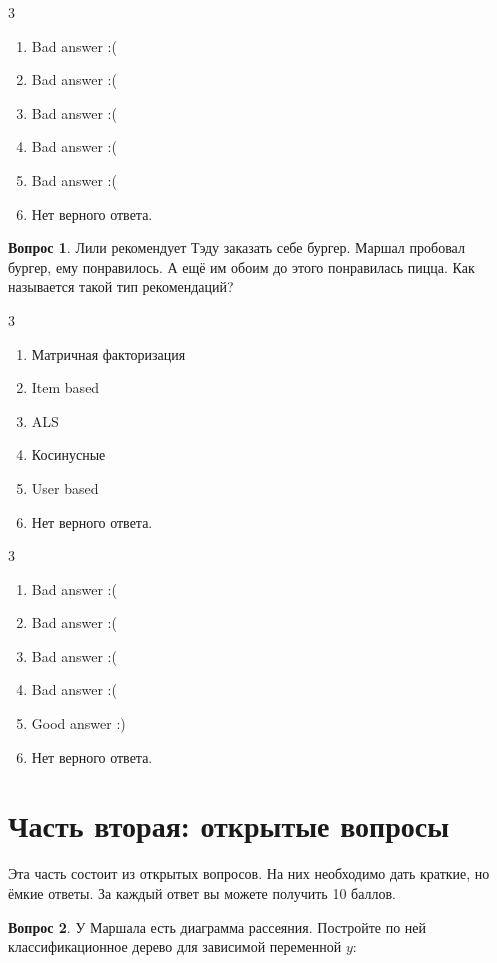 \documentclass[12pt]{article}
\newenvironment{answerlist}[1][3]{
\begin{multicols}{#1}

\begin{enumerate}[label=\fbox{\emph{\Alph*}},ref=\emph{\alph*}]
}
{
\item Нет верного ответа.
\end{enumerate}
\end{multicols}
}
\theoremstyle{definition}
\newtheorem{question}{Вопрос}
\begin{document}
\begin{solution}
\begin{answerlist}
  \item Bad answer :(
  \item Bad answer :(
  \item Bad answer :(
  \item Bad answer :(
  \item Bad answer :(
\end{answerlist}
\end{solution}


\begin{question}
Лили рекомендует Тэду заказать себе бургер. Маршал пробовал бургер, ему понравилось. А ещё им обоим до этого понравилась пицца. Как называется такой тип рекомендаций? 
\begin{answerlist}
  \item  Матричная факторизация
  \item  Item based
  \item  ALS
  \item  Косинусные
  \item  User based
\end{answerlist}
\end{question}

\begin{solution}
\begin{answerlist}
  \item Bad answer :(
  \item Bad answer :(
  \item Bad answer :(
  \item Bad answer :(
  \item Good answer :)
\end{answerlist}
\end{solution}

\newpage 

\section*{Часть вторая: открытые вопросы}

Эта часть состоит из открытых вопросов. На них необходимо дать краткие, но ёмкие ответы. За каждый ответ вы можете получить 10 баллов.


\begin{question}
    У Маршала есть диаграмма рассеяния. Постройте по ней классификационное дерево для зависимой переменной $y$:
    
    \begin{center}
      \begin{tikzpicture}[scale = 0.015]
      
      \end{tikzpicture}
    \end{center}
\end{question}
\end{document}
